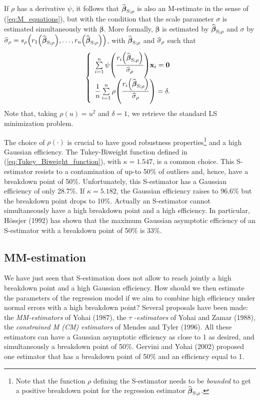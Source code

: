 If $\rho$ has a derivative $\psi$, it follows that $\widehat{\boldsymbol{\beta
}}_{\mathrm{S};\rho}$ is also an M-estimate in the sense of
(\ref{eq:M_equations}), but with the condition that the scale parameter
$\sigma$ is estimated simultaneously with $\boldsymbol\beta$. More formally,
$\boldsymbol\beta$ is estimated by $\sthat{\boldsymbol\beta}%
_{\mathrm{S};\rho}$ and $\sigma$ by $\sthat{\sigma}_{\rho}=s_{\rho}\left(
r_{1}\left(  \sthat{\boldsymbol\beta}_{\mathrm{S};\rho}\right)
,\ldots,r_{n}\left(  \sthat{\boldsymbol\beta}_{\mathrm{S};\rho}\right)
\right)  $, with $\widehat{\boldsymbol\beta}_{\mathrm{S};\rho}$ and
$\widehat{\sigma}_{\rho}$ such that
\[
\left\{
\begin{array}
[c]{l}%
\sum\limits_{i=1}^{n}\psi\left(  \dfrac{r_{i}\left(  \widehat
{\boldsymbol\beta}_{\mathrm{S};\rho}\right)  }{\sthat{\sigma}_{\rho}%
}\right)  \stvec{x}_{i}=\mathbf{0}\\
\dfrac{1}{n}\sum\limits_{i=1}^{n}\rho\left(  \dfrac{r_{i}\left(
\sthat{\boldsymbol\beta}_{\mathrm{S};\rho}\right)  }{\sthat{\sigma
}_{\rho}}\right)  =\delta.
\end{array}
\right.
\]
Note that, taking $\rho\left(  u\right)  =u^{2}$ and $\delta=1$, we retrieve
the standard LS minimization problem.

The choice of $\rho\left(  \cdot\right)  $ is crucial to have good robustness
properties\footnote{Note that the function $\rho$ defining the S-estimator
needs to be \emph{bounded} to get a positive breakdown point for the
regression estimator $\widehat{\boldsymbol\beta}_{\mathrm{S};\rho}$.} and a
high Gaussian efficiency. The Tukey-Biweight function defined in
(\ref{eq:Tukey_Biweight_function}), with $\kappa=1.547$, is a common choice.
This S-estimator resists to a contamination of up-to 50\% of outliers and,
hence, have a breakdown point of 50\%. Unfortunately, this S-estimator has a
Gaussian efficiency of only 28.7\%. If $\kappa=5.182$, the Gaussian efficiency
raises to 96.6\% but the breakdown point drops to 10\%. Actually an
S-estimator cannot simultaneously have a high breakdown point and a high
efficiency. In particular, H\"{o}ssjer (1992) has shown that the maximum
Gaussian asymptotic efficiency of an S-estimator with a breakdown point of
50\% is 33\%.

\subsection{MM-estimation}
\label{subsec:MM_estimation}

We have just seen that S-estimation does not allow to reach jointly a high
breakdown point and a high Gaussian efficiency. How should we then estimate
the parameters of the regression model if we aim to combine high efficiency
under normal errors with a high breakdown point? Several proposals have been
made: the \emph{MM-estimators} of Yohai (1987), the $\tau$%
\emph{-estimators} of Yohai and Zamar (1988), the \emph{constrained M (CM)
estimators} of Mendes and Tyler (1996). All these estimators can have a
Gaussian asymptotic efficiency as close to 1 as desired, and simultaneously a
breakdown point of 50\%. Gervini and Yohai (2002) proposed one estimator that
has a breakdown point of 50\% and an efficiency equal to 1.

